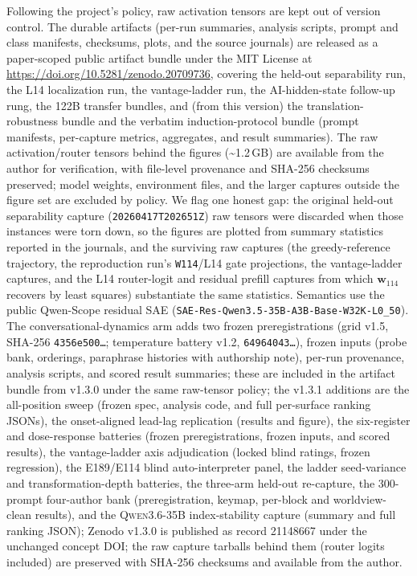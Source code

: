 \documentclass[10pt,a4paper,twocolumn]{article}
\newcommand{\wvec}{\mathbf{w}_{114}}
\begin{document}
Following the project's policy, raw activation tensors are kept out of version
control. The durable artifacts (per-run summaries, analysis scripts, prompt and
class manifests, checksums, plots, and the source journals) are released as a
paper-scoped public artifact bundle under the MIT License at
\url{https://doi.org/10.5281/zenodo.20709736}, covering the held-out
separability run, the L14 localization run, the vantage-ladder run, the
AI-hidden-state follow-up rung, the 122B transfer bundles, and (from this
version) the translation-robustness bundle and the verbatim induction-protocol
bundle (prompt manifests, per-capture metrics, aggregates, and result
summaries). The raw
activation/router tensors behind the figures
(\textasciitilde1.2\,GB) are available from the author for verification, with
file-level provenance and SHA-256 checksums preserved; model weights, environment
files, and the larger captures outside the figure set are excluded by policy. We flag one
honest gap: the original held-out separability capture
(\texttt{20260417T202651Z}) raw tensors were discarded when those instances were
torn down, so the figures are plotted from summary statistics reported in the
journals, and the surviving raw captures (the greedy-reference trajectory, the
reproduction run's \texttt{W114}/L14 gate projections, the vantage-ladder
captures, and the L14 router-logit and residual prefill captures from which
$\wvec$ recovers by least squares) substantiate the same statistics. Semantics
use the public Qwen-Scope residual SAE
(\texttt{SAE-Res-Qwen3.5-35B-A3B-Base-W32K-L0\_50}). The conversational-dynamics
arm adds two frozen preregistrations (grid v1.5, SHA-256
\texttt{4356e500\ldots}; temperature battery v1.2, \texttt{64964043\ldots}),
frozen inputs (probe bank, orderings, paraphrase histories with authorship
note), per-run provenance, analysis scripts, and scored result summaries;
these are included in the artifact bundle from v1.3.0 under the same
raw-tensor policy;
the v1.3.1 additions are the all-position sweep (frozen spec, analysis code,
and full per-surface ranking JSONs), the onset-aligned lead-lag replication
(results and figure), the six-register and dose-response batteries
(frozen preregistrations, frozen inputs, and scored results), the
vantage-ladder axis adjudication (locked blind ratings, frozen regression),
the E189/E114 blind auto-interpreter panel, the ladder seed-variance and
transformation-depth batteries, the three-arm held-out re-capture, the
300-prompt four-author bank (preregistration, keymap, per-block and
worldview-clean results), and the \textsc{Qwen3.6-35B} index-stability
capture (summary and full ranking JSON); Zenodo v1.3.0
is published as record 21148667 under the unchanged concept DOI;
the raw capture tarballs behind them (router logits
included) are preserved with SHA-256 checksums and available from the author.
\end{document}
